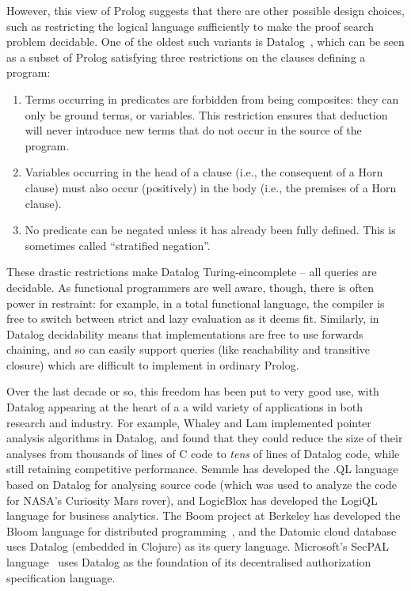 However, this view of Prolog suggests that there are other possible
design choices, such as restricting the logical language sufficiently
to make the proof search problem decidable. One of the oldest such
variants is Datalog~\cite{datalog}, which can be seen as a subset of
Prolog satisfying three restrictions on the clauses defining a program:
\begin{enumerate}
\item Terms occurring in predicates are forbidden from being
  composites: they can only be ground terms, or variables. This
  restriction ensures that deduction will never introduce new terms
  that do not occur in the source of the program.
\item Variables occurring in the head of a clause (i.e., the
  consequent of a Horn clause) must also occur (positively) in the
  body (i.e., the premises of a Horn clause).
\item No predicate can be negated unless it has already been fully
  defined.  This is sometimes called ``stratified negation''.
\end{enumerate}
These drastic restrictions make Datalog Turing-eincomplete -- all
queries are decidable. As functional programmers are well aware,
though, there is often power in restraint: for example, in a total
functional language, the compiler is free to switch between strict and
lazy evaluation as it deems fit. Similarly, in Datalog decidability
means that implementations are free to use forwards chaining, and so
can easily support queries (like reachability and transitive closure)
which are difficult to implement in ordinary Prolog.

Over the last decade or so, this freedom has been put to very good
use, with Datalog appearing at the heart of a a wild variety of
applications in both research and industry.  For example, Whaley and
Lam \cite{whaley-lam,whaley-phd} implemented pointer analysis
algorithms in Datalog, and found that they could reduce the size of
their analyses from thousands of lines of C code to \emph{tens} of
lines of Datalog code, while still retaining competitive
performance. Semmle has developed the .QL
language~\cite{semmlecode,ql-inference} based on Datalog for analysing
source code (which was used to analyze the code for NASA's Curiosity
Mars rover), and LogicBlox has developed the LogiQL~\cite{logicblox}
language for business analytics. The Boom project at Berkeley has
developed the Bloom language for distributed programming~\cite{bloom},
and the Datomic cloud database~\cite{datomic} uses Datalog (embedded
in Clojure) as its query language. Microsoft's SecPAL
language~\cite{secpal} uses Datalog as the foundation of its
decentralised authorization specification language.

